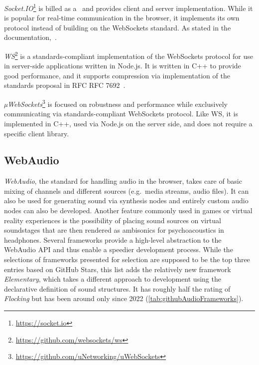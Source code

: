 

\emph{Socket.IO}\footnote{\url{https://socket.io}} is billed as a~ and provides client and server implementation.
While it is popular for real-time communication in the browser, it implements its own protocol instead of building on the WebSockets standard.
As stated in the documentation,~.

\emph{WS}\footnote{\url{https://github.com/websockets/ws}} is a standards-compliant implementation of the WebSockets protocol for use in server-side applications written in Node.js.
It is written in C++ to provide good performance, and it supports compression via implementation of the standards proposal in \ac{RFC} RFC 7692~.

\emph{µWebSockets}\footnote{\url{https://github.com/uNetworking/uWebSockets}} is focused on robustness and performance while exclusively communicating via standards-compliant WebSockets protocol.
Like WS, it is implemented in C++, used via Node.js on the server side, and does not require a specific client library.

\subsection{WebAudio}

\emph{WebAudio}, the standard for handling audio in the browser, takes care of basic mixing of channels and different sources (e.g.\ media streams, audio files).
It can also be used for generating sound via synthesis nodes and entirely custom audio nodes can also be developed.
Another feature commonly used in games or virtual reality experiences is the possibility of placing sound sources on virtual soundstages that are then rendered as ambisonics for psychoacoustics in headphones.
Several frameworks provide a high-level abstraction to the WebAudio \ac{API} and thus enable a speedier development process.
While the selections of frameworks presented for selection are supposed to be the top three entries based on GitHub Stars, this list adds the relatively new framework \emph{Elementary}, which takes a different approach to development using the declarative definition of sound structures.
It has roughly half the rating of \emph{Flocking} but has been around only since 2022 (\ref{tab:githubAudioFrameworks}).

